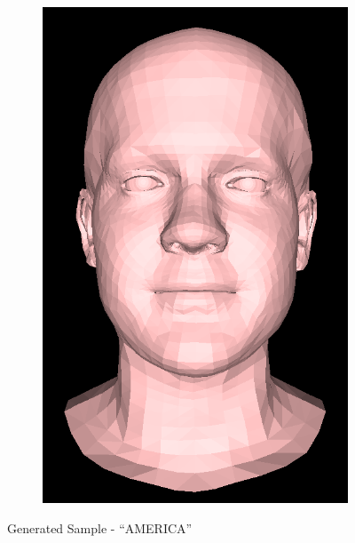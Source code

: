 \begin{figure}[h!]
\begin{subfigure}[b]{0.19\textwidth}
        \includegraphics[width=\textwidth]{figures/gen_sample/00039.png}
    \end{subfigure}
    \caption{Generated Sample - ``AMERICA''}\label{fig:Gen_America}
\end{figure}